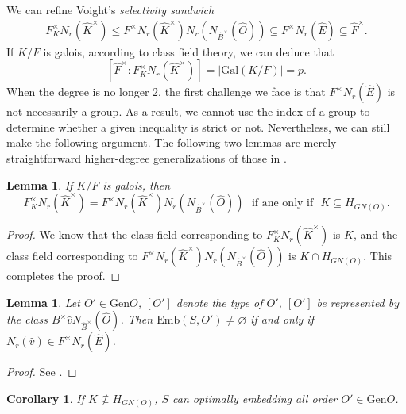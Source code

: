 \documentclass[12pt]{article}
\theoremstyle{plain}
\newtheorem{corollary}[theorem]{Corollary}
\newtheorem{lemma}[theorem]{Lemma}
\theoremstyle{definition}
\theoremstyle{remark}
\begin{document}
We can refine Voight's \textit{selectivity sandwich} \cite[31.3.14]{voight2021quaternion}
\begin{align*}
F^\times_K N_r(\widehat{K}^\times)\leq F^\times N_r(\widehat{K}^\times)N_r(N_{\widehat{B}^\times}(\widehat{O}))\subseteq F^\times N_r(\widehat{E})\subseteq \widehat{F}^\times. \tag{*}
\end{align*}
If $K/F$ is galois, according to class field theory, we can deduce that 
$$[\widehat{F}^\times:F^\times_K N_r(\widehat{K}^\times)]=|\mathrm{Gal}(K/F)|=p.$$
When the degree is no longer 2, the first challenge we face is that $F^\times N_r(\widehat{E})$ is not necessarily a group. As a result, we cannot use the index of a group to determine whether a given inequality is strict or not. Nevertheless, we can still make the following argument. The following two lemmas are merely straightforward higher-degree generalizations of those in \cite[31.4]{voight2021quaternion}.

\begin{lemma}\label{1}
If $K/F$ is galois, then 
$$F^\times_K N_r(\widehat{K}^\times)= F^\times N_r(\widehat{K}^\times)N_r(N_{\widehat{B}^\times}(\widehat{O})) \ \ \ \text{if ane only if} \ \ \ K\subseteq H_{GN(O)} . $$ 
\end{lemma}

\begin{proof}
We know that the class field corresponding to $F^\times_K N_r(\widehat{K}^\times)$ is $K$, and the class field corresponding to $F^\times N_r(\widehat{K}^\times)N_r(N_{\widehat{B}^\times}(\widehat{O}))$ is $K\cap H_{GN(O)}$. This completes the proof.
\end{proof}

\begin{lemma}\label{2}
Let $O'\in \mathrm{Gen} O$, $[O']$ denote the type of $O'$, $[O']$ be represented by the class $B^\times \widehat{v} N_{\widehat{B}^\times}(\widehat{O})$. Then $\mathrm{Emb}(S,O')\neq \varnothing$ if and only if $N_r(\widehat{v})\in F^\times N_r(\widehat{E})$.
\end{lemma}

\begin{proof}
See \cite[Proposition 31.4.4]{voight2021quaternion}.
\end{proof}


\begin{corollary}\label{COR}
If $K\not \subseteq H_{GN(O)}$, $S$ can optimally embedding all order $O'\in \mathrm{Gen} O$.
\end{corollary}
\end{document}
